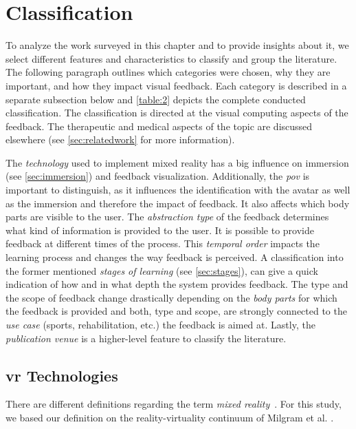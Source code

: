 \section{Classification \label{sec:classification}}
To analyze the work surveyed in this chapter and to provide insights about it, we select different features and characteristics to classify and group the literature. The following paragraph outlines which categories were chosen, why they are important, and how they impact visual feedback. Each category is described in a separate subsection below and \autoref{table:2} depicts the complete conducted classification. The classification is directed at the visual computing aspects of the feedback. The therapeutic and medical aspects of the topic are discussed elsewhere (see \autoref{sec:relatedwork} for more information).


The \textit{technology} used to implement mixed reality has a big influence on immersion (see \autoref{sec:immersion}) and feedback visualization. Additionally, the \textit{\acrshort{pov}} is important to distinguish, as it influences the identification with the avatar as well as the immersion and therefore the impact of feedback. It also affects which body parts are visible to the user. The \textit{abstraction type} of the feedback determines what kind of information is provided to the user. It is possible to provide feedback at different times of the process. This \textit{temporal order} impacts the learning process and changes the way feedback is perceived. A classification into the former mentioned \textit{stages of learning} (see \autoref{sec:stages}), can give a quick indication of how and in what depth the system provides feedback. The type and the scope of feedback change drastically depending on the \textit{body parts} for which the feedback is provided and both, type and scope, are strongly connected to the \emph{use case} (sports, rehabilitation, etc.) the feedback is aimed at. Lastly, the \textit{publication venue} is a higher-level feature to classify the literature.

\subsection*{\acrshort{vr} Technologies \label{sec:MR}}
There are different definitions regarding the term \emph{mixed reality}~\cite{whatIsMR}. For this study, we based our definition on the reality-virtuality continuum of Milgram et al. \cite{milgram1994arc}.

